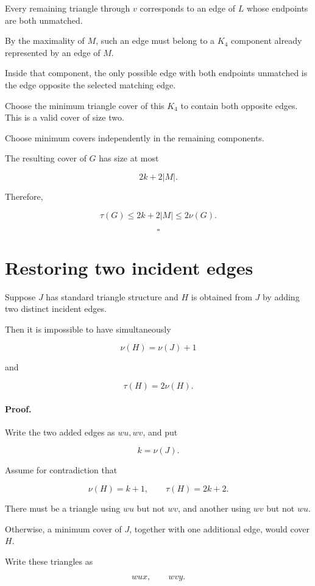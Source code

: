 \documentclass[11pt]{article}
\begin{document}
Every remaining triangle through \(v\) corresponds to an edge of \(L\) whose endpoints are both unmatched.

By the maximality of \(M\), such an edge must belong to a \(K_4\) component already represented by an edge of \(M\).

Inside that component, the only possible edge with both endpoints unmatched is the edge opposite the selected matching edge.

Choose the minimum triangle cover of this \(K_4\) to contain both opposite edges. This is a valid cover of size two.

Choose minimum covers independently in the remaining components.

The resulting cover of \(G\) has size at most

\[
2k+2|M|.
\]

Therefore,

\[
\boxed{
\tau(G)\leq2k+2|M|\leq2\nu(G).
}
\]

\[
\square
\]

\section{Restoring two incident edges}

Suppose \(J\) has standard triangle structure and \(H\) is obtained from \(J\) by adding two distinct incident edges.

Then it is impossible to have simultaneously

\[
\nu(H)=\nu(J)+1
\]

and

\[
\tau(H)=2\nu(H).
\]

\paragraph{Proof.}

Write the two added edges as \(wu,wv\), and put

\[
k=\nu(J).
\]

Assume for contradiction that

\[
\nu(H)=k+1,\qquad \tau(H)=2k+2.
\]

There must be a triangle using \(wu\) but not \(wv\), and another using \(wv\) but not \(wu\).

Otherwise, a minimum cover of \(J\), together with one additional edge, would cover \(H\).

Write these triangles as

\[
wux,\qquad wvy.
\]
\end{document}
